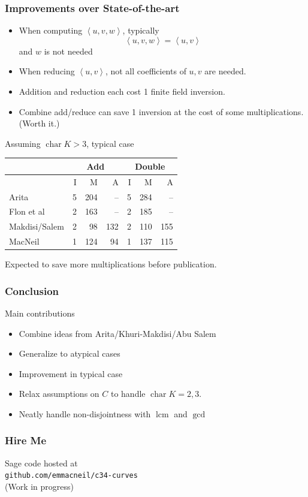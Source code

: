 \documentclass{beamer}
\newcommand{\pid}[1]{\left\langle #1 \right\rangle}
\DeclareMathOperator{\Char}{char}
\DeclareMathOperator{\lcm}{lcm}
\begin{document}

\begin{frame}
\frametitle{Improvements over State-of-the-art}
  \begin{itemize}
    \item When computing $\pid{u, v, w}$, typically \[ \pid{u,v,w} = \pid{u,v} \] and $w$ is not needed
    \item When reducing $\pid{u, v}$, not all coefficients of $u, v$ are needed. 
    \item Addition and reduction each cost 1 finite field inversion.
    \item Combine add/reduce can save 1 inversion at the cost of some multiplications. (Worth it.)
  \end{itemize}

  Assuming $\Char K > 3$, typical case
  \begin{center}
    \begin{tabular}{l|rrr|rrr}
      & \multicolumn{3}{|c}{Add} & \multicolumn{3}{|c}{Double} \\
      \hline
      & I & M & A & I & M & A \\
      \hline
      Arita         & 5 & 204 &  -- & 5 & 284 & -- \\
      Flon et al    & 2 & 163 &  -- & 2 & 185 &  -- \\
      Makdisi/Salem & 2 &  98 & 132 & 2 & 110 & 155 \\
      MacNeil       & 1 & 124 & 94  & 1 & 137 & 115 
    \end{tabular}
  \end{center}
  Expected to save more multiplications before publication.
\end{frame}


\begin{frame}
\frametitle{Conclusion}
  Main contributions
  \begin{itemize}
    \item Combine ideas from Arita/Khuri-Makdisi/Abu Salem
    \item Generalize to atypical cases
    \item Improvement in typical case
    \item Relax assumptions on $C$ to handle $\Char K = 2, 3$.
    \item Neatly handle non-disjointness with $\lcm$ and $\gcd$
  \end{itemize}
\end{frame}


\begin{frame}
\frametitle{Hire Me}
  \begin{center}
    Sage code hosted at \\
    {\tt github.com/emmacneil/c34-curves} \\
    (Work in progress) \\
  \end{center}
  \printbibliography
\end{frame}

\end{document}
